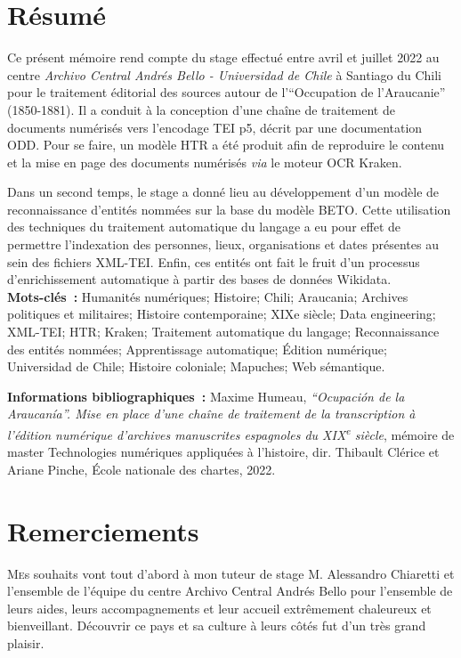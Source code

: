 \documentclass[a4paper,12pt,twoside]{book}
\begin{document}
	\chapter{Résumé}
	\medskip
	Ce présent mémoire rend compte du stage effectué entre avril et juillet 2022 au centre \textit{Archivo Central Andrés Bello - Universidad de Chile} à Santiago du Chili pour le traitement éditorial des sources autour de l'\enquote{Occupation de l'Araucanie} (1850-1881). Il a conduit à la conception d'une chaîne de traitement de documents numérisés vers l'encodage TEI p5, décrit par une documentation ODD. Pour se faire, un modèle HTR a été produit afin de reproduire le contenu et la mise en page des documents numérisés \textit{via} le moteur OCR Kraken.
	
	Dans un second temps, le stage a donné lieu au développement d'un modèle de reconnaissance d'entités nommées sur la base du modèle BETO. Cette utilisation des techniques du traitement automatique du langage a eu pour effet de permettre l'indexation des personnes, lieux, organisations et dates présentes au sein des fichiers XML-TEI. Enfin, ces entités ont fait le fruit d'un processus d'enrichissement automatique à partir des bases de données Wikidata.
	\\
	
	\textbf{Mots-clés~:} Humanités numériques; Histoire; Chili; Araucania; Archives politiques et militaires; Histoire contemporaine; XIXe siècle; Data engineering; XML-TEI; HTR; Kraken; Traitement automatique du langage; Reconnaissance des entités nommées; Apprentissage automatique; Édition numérique; Universidad de Chile; Histoire coloniale; Mapuches; Web sémantique.
	
	\textbf{Informations bibliographiques~:} Maxime Humeau, \textit{\enquote{Ocupación de la Araucanía}. Mise en place d'une chaîne de traitement de la transcription à l'édition numérique d'archives manuscrites espagnoles du XIX\textsuperscript{e} siècle}, mémoire de master \og{}Technologies numériques appliquées à l'histoire\fg{}, dir. Thibault Clérice et Ariane Pinche, École nationale des chartes, 2022.
	
	\chapter{Remerciements}
	
	\lettrine{M}es souhaits vont tout d’abord à mon tuteur de stage M. Alessandro Chiaretti et l'ensemble de l'équipe du centre Archivo Central Andrés Bello pour l'ensemble de leurs aides, leurs accompagnements et leur accueil extrêmement chaleureux et bienveillant. Découvrir ce pays et sa culture à leurs côtés fut d'un très grand plaisir.
	
\end{document}
